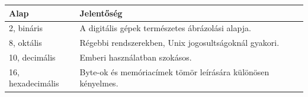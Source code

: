 \begin{tabularx}{\textwidth}{lX}
\toprule
Alap & Jelentőség \\
\midrule
2, bináris & A digitális gépek természetes ábrázolási alapja. \\
8, oktális & Régebbi rendszerekben, Unix jogosultságoknál gyakori. \\
10, decimális & Emberi használatban szokásos. \\
16, hexadecimális & Byte-ok és memóriacímek tömör leírására különösen kényelmes. \\
\bottomrule
\end{tabularx}
